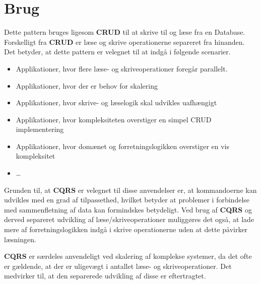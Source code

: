 \section{Brug}
Dette pattern bruges ligesom \textbf{CRUD} til at skrive til og læse fra en Database. Forskelligt fra \textbf{CRUD} er læse og skrive operationerne separeret fra hinanden. Det betyder, at dette pattern er velegnet til at indgå i følgende scenarier.

\begin{itemize}  
	\item Applikationer, hvor flere læse- og skriveoperationer foregår parallelt.
	\item Applikationer, hvor der er behov for skalering
	\item Applikationer, hvor skrive- og læselogik skal udvikles uafhængigt
	\item Applikationer, hvor kompleksiteten overstiger en simpel CRUD implementering
	\item Applikationer, hvor domænet og forretningslogikken overstiger en vis kompleksitet
	\item \ldots
	
\end{itemize}

Grunden til, at \textbf{CQRS} er velegnet til disse anvendelser er, at kommandoerne kan udvikles med en grad af tilpassethed, hvilket betyder at problemer i forbindelse med sammenfletning af data kan formindskes betydeligt.
Ved brug af \textbf{CQRS} og derved separeret udvikling af læse/skriveoperationer muliggøres det også, at lade mere af forretningslogikken indgå i skrive operationerne uden at dette påvirker læsningen.

\textbf{CQRS} er særdeles anvendeligt ved skalering af komplekse systemer, da det ofte er gældende, at der er uligevægt i antallet læse- og skriveoperationer. Det medvirker til, at den separerede udvikling af disse er eftertragtet.
 


